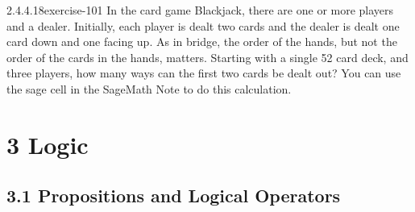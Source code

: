 \documentclass[twoside,10pt,]{book}
\numberwithin{equation}{section}
\begin{document}
\begin{divisionsolution}{2.4.4.18}{}{exercise-101}%
\hypertarget{p-850}{}%
In the card game Blackjack, there are one or more players and a dealer.  Initially, each player is dealt two cards and the dealer is dealt one card down and one facing up.  As in bridge, the order of the hands, but not the order of the cards in the hands, matters.  Starting with a single 52 card deck, and three players, how many ways can the first two cards be dealt out?  You can use the sage cell in the SageMath Note to do this calculation.%
\end{divisionsolution}%
\chapter*{3 Logic}
\section*{3.1 Propositions and Logical Operators}
\end{document}
